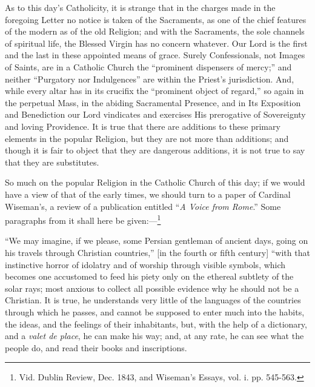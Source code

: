 As to this day's Catholicity, it is strange that
in the charges made in the foregoing Letter no notice is taken of the
Sacraments, as one of the chief features of the modern as of the old
Religion; and with the Sacraments, the sole channels of spiritual
life, the Blessed Virgin has no concern whatever. Our Lord is the
first and the last in these appointed means of grace. Surely
Confessionals, not Images of Saints, are in a Catholic Church the ``prominent
dispensers of mercy;'' and neither ``Purgatory nor Indulgences'' are
within the Priest's jurisdiction. And, while every altar has in its
crucifix the ``prominent object of regard,'' so again in the
perpetual Mass, in the abiding Sacramental Presence, and in Its
Exposition and Benediction our Lord vindicates and exercises His
prerogative of Sovereignty and loving Providence. It is true that
there are additions to these primary elements in the popular Religion,
but they are not more than additions; and though it is fair to object
that they are dangerous additions, it is not true to say that they are
substitutes.

So much on the popular Religion in the Catholic
Church of this day; if we would have a view of that of the early
times, we should turn to a paper of Cardinal Wiseman's, a review of a
publication entitled ``\emph{A Voice from Rome}.'' Some paragraphs from
it shall here be given:—\footnote{Vid. Dublin Review, Dec. 1843, and Wiseman's Essays, vol. i. pp.
545-563.}

``We may imagine, if we please, some Persian
gentleman of ancient days, going on his travels through Christian
countries,'' [in the fourth or fifth century] ``with that instinctive
horror of idolatry and of worship through visible symbols, which
becomes one accustomed to feed his piety only on the ethereal subtlety
of the solar rays; most anxious to collect all possible evidence why
he should not be a Christian. It is true, he understands very little
of the languages of the countries through which he passes, and cannot
be supposed to enter much into the habits, the ideas, and the feelings
of their inhabitants, but, with the help of a dictionary, and a \emph{valet
de place}, he can make his way; and, at any rate, he can see what
the people do, and read their books and inscriptions.

